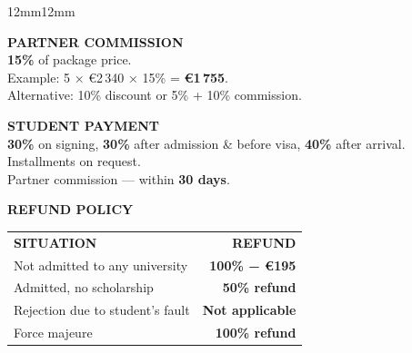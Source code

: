 \documentclass[11pt,a4paper]{article}
\begin{document}
\begin{adjustwidth}{12mm}{12mm}
\vspace{3mm}
\noindent\begin{minipage}[t]{0.48\linewidth}
\begin{tcolorbox}[enhanced, colback=white, colframe=electric, boxrule=0pt, leftrule=3pt, arc=2mm, left=3mm, right=3mm, top=2.5mm, bottom=2.5mm]
{\color{electric}\bfseries\small PARTNER COMMISSION}\\[2pt]
{\color{darktext}\small
\textbf{\color{navy}15\%} of package price.\\[1pt]
Example: 5 × €2\,340 × 15\% = \textbf{\color{coral}€1\,755}.\\[1pt]
Alternative: 10\% discount or 5\% + 10\% commission.}
\end{tcolorbox}
\end{minipage}\hfill%
\begin{minipage}[t]{0.48\linewidth}
\begin{tcolorbox}[enhanced, colback=white, colframe=coral, boxrule=0pt, leftrule=3pt, arc=2mm, left=3mm, right=3mm, top=2.5mm, bottom=2.5mm]
{\color{coral}\bfseries\small STUDENT PAYMENT}\\[2pt]
{\color{darktext}\small
\textbf{30\%} on signing, \textbf{30\%} after admission \& before visa, \textbf{40\%} after arrival.\\[1pt]
Installments on request.\\[1pt]
Partner commission — within \textbf{30 days}.}
\end{tcolorbox}
\end{minipage}

\vspace{4mm}
{\color{grayT}\fontsize{7.5pt}{9pt}\selectfont\bfseries REFUND POLICY}

\vspace{2mm}
\renewcommand{\arraystretch}{1.2}
\begin{tabularx}{\linewidth}{@{}X r@{}}
  \rowcolor{navy} {\color{white}\bfseries\small SITUATION} & {\color{white}\bfseries\small REFUND} \\
  Not admitted to any university & {\color{electric}\bfseries 100\% − €195} \\
  Admitted, no scholarship & {\color{amber}\bfseries 50\% refund} \\
  Rejection due to student's fault & {\color{coral}\bfseries Not applicable} \\
  Force majeure & {\color{limeD}\bfseries 100\% refund} \\
\end{tabularx}


\end{adjustwidth}
\end{document}
